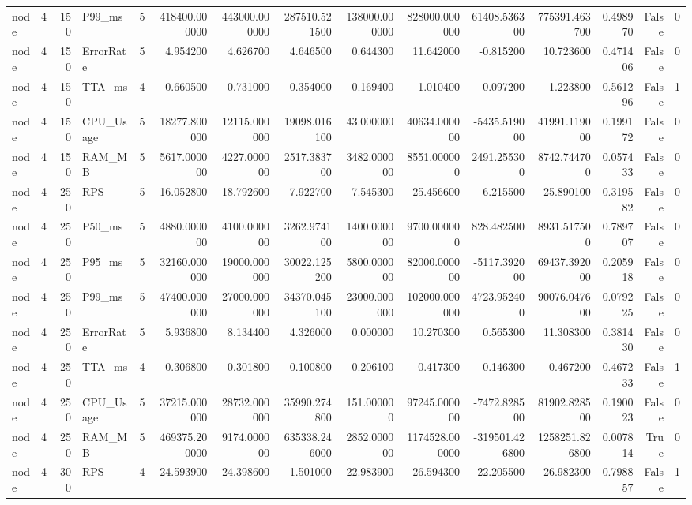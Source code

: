 \begin{tabular}{lrrlrrrrrrrrrrr}
node & 4 & 150 & P99_ms & 5 & 418400.000000 & 443000.000000 & 287510.521500 & 138000.000000 & 828000.000000 & 61408.536300 & 775391.463700 & 0.498970 & False & 0 \\
node & 4 & 150 & ErrorRate & 5 & 4.954200 & 4.626700 & 4.646500 & 0.644300 & 11.642000 & -0.815200 & 10.723600 & 0.471406 & False & 0 \\
node & 4 & 150 & TTA_ms & 4 & 0.660500 & 0.731000 & 0.354000 & 0.169400 & 1.010400 & 0.097200 & 1.223800 & 0.561296 & False & 1 \\
node & 4 & 150 & CPU_Usage & 5 & 18277.800000 & 12115.000000 & 19098.016100 & 43.000000 & 40634.000000 & -5435.519000 & 41991.119000 & 0.199172 & False & 0 \\
node & 4 & 150 & RAM_MB & 5 & 5617.000000 & 4227.000000 & 2517.383700 & 3482.000000 & 8551.000000 & 2491.255300 & 8742.744700 & 0.057433 & False & 0 \\
node & 4 & 250 & RPS & 5 & 16.052800 & 18.792600 & 7.922700 & 7.545300 & 25.456600 & 6.215500 & 25.890100 & 0.319582 & False & 0 \\
node & 4 & 250 & P50_ms & 5 & 4880.000000 & 4100.000000 & 3262.974100 & 1400.000000 & 9700.000000 & 828.482500 & 8931.517500 & 0.789707 & False & 0 \\
node & 4 & 250 & P95_ms & 5 & 32160.000000 & 19000.000000 & 30022.125200 & 5800.000000 & 82000.000000 & -5117.392000 & 69437.392000 & 0.205918 & False & 0 \\
node & 4 & 250 & P99_ms & 5 & 47400.000000 & 27000.000000 & 34370.045100 & 23000.000000 & 102000.000000 & 4723.952400 & 90076.047600 & 0.079225 & False & 0 \\
node & 4 & 250 & ErrorRate & 5 & 5.936800 & 8.134400 & 4.326000 & 0.000000 & 10.270300 & 0.565300 & 11.308300 & 0.381430 & False & 0 \\
node & 4 & 250 & TTA_ms & 4 & 0.306800 & 0.301800 & 0.100800 & 0.206100 & 0.417300 & 0.146300 & 0.467200 & 0.467233 & False & 1 \\
node & 4 & 250 & CPU_Usage & 5 & 37215.000000 & 28732.000000 & 35990.274800 & 151.000000 & 97245.000000 & -7472.828500 & 81902.828500 & 0.190023 & False & 0 \\
node & 4 & 250 & RAM_MB & 5 & 469375.200000 & 9174.000000 & 635338.246000 & 2852.000000 & 1174528.000000 & -319501.426800 & 1258251.826800 & 0.007814 & True & 0 \\
node & 4 & 300 & RPS & 4 & 24.593900 & 24.398600 & 1.501000 & 22.983900 & 26.594300 & 22.205500 & 26.982300 & 0.798857 & False & 1 \\

\end{tabular}
